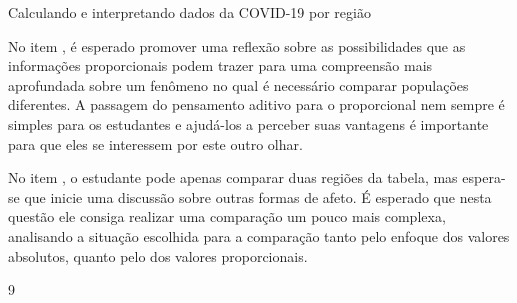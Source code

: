 \begin{answer}{Calculando e interpretando dados da COVID-19 por região}
{  No item , é esperado promover uma reflexão sobre as possibilidades que as informações proporcionais podem trazer para uma compreensão mais aprofundada sobre um fenômeno no qual é necessário comparar populações diferentes. A passagem do pensamento aditivo para o proporcional nem sempre é simples para os estudantes e ajudá-los a perceber suas vantagens é importante para que eles se interessem por este outro olhar.

  No item , o estudante pode apenas comparar duas regiões da tabela, mas espera-se que inicie uma discussão sobre outras formas de afeto. É esperado que nesta questão ele consiga realizar uma comparação um pouco mais complexa, analisando a situação escolhida para a comparação tanto pelo enfoque dos valores absolutos, quanto pelo dos valores proporcionais.  

}{9}
\end{answer}

